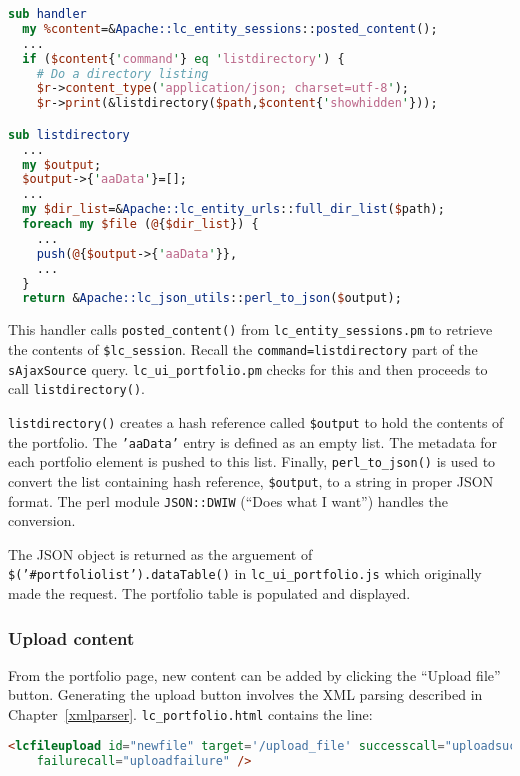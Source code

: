 \begin{lstlisting}[language=Perl,frame=single,title=lc\_ui\_portfolio.pm]
sub handler
  my %content=&Apache::lc_entity_sessions::posted_content();
  ...
  if ($content{'command'} eq 'listdirectory') {
    # Do a directory listing
    $r->content_type('application/json; charset=utf-8');
    $r->print(&listdirectory($path,$content{'showhidden'}));

sub listdirectory
  ...
  my $output;
  $output->{'aaData'}=[];
  ...
  my $dir_list=&Apache::lc_entity_urls::full_dir_list($path);
  foreach my $file (@{$dir_list}) {
    ...
    push(@{$output->{'aaData'}},
    ...
  }
  return &Apache::lc_json_utils::perl_to_json($output);
\end{lstlisting}

This handler calls {\tt posted\_content()} from {\tt lc\_entity\_sessions.pm} to retrieve the contents of {\tt \$lc\_session}.  Recall the {\tt command=listdirectory} part of the {\tt sAjaxSource} query. {\tt lc\_ui\_portfolio.pm} checks for this and then proceeds to call {\tt listdirectory()}.  

{\tt listdirectory()} creates a hash reference called {\tt \$output} to hold the contents of the portfolio.  The {\tt 'aaData'} entry is defined as an empty list.  The metadata for each portfolio element is pushed to this list.  Finally, {\tt perl\_to\_json()} is used to convert the list containing hash reference, {\tt \$output}, to a string in proper JSON format.  The perl module {\tt JSON::DWIW} (``Does what I want'') handles the conversion.

The JSON object is returned as the arguement of {\tt \$('\#portfoliolist').dataTable()} in {\tt lc\_ui\_portfolio.js} which originally made the request.  The portfolio table is populated and displayed.

\subsubsection{Upload content}
From the portfolio page, new content can be added by clicking the ``Upload file'' button.  Generating the upload button involves the XML parsing described in Chapter~\ref{xmlparser}.  {\tt lc\_portfolio.html} contains the line:

\begin{lstlisting}[language=HTML,frame=single,title=lc\_portfolio.html]
<lcfileupload id="newfile" target='/upload_file' successcall="uploadsuccess" 
    failurecall="uploadfailure" /> 
\end{lstlisting}

